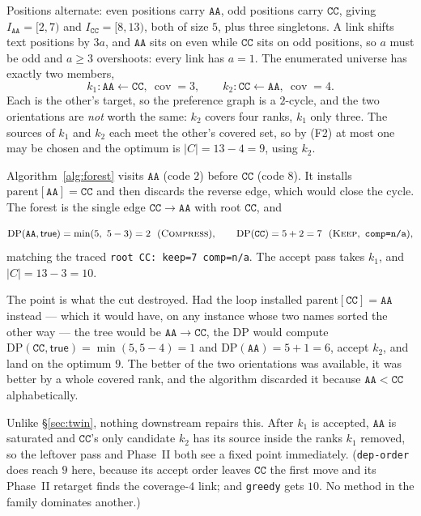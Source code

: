 \documentclass[11pt,a4paper]{article}
\theoremstyle{definition}
\theoremstyle{plain}
\theoremstyle{remark}
\newcommand{\cov}{\operatorname{cov}}
\newcommand{\KEEP}{\textnormal{\textsc{Keep}}}
\newcommand{\COMP}{\textnormal{\textsc{Compress}}}
\begin{document}
Positions alternate: even positions carry $\mathtt{AA}$, odd positions
carry $\mathtt{CC}$, giving $I_{\mathtt{AA}} = [2,7)$ and
$I_{\mathtt{CC}} = [8,13)$, both of size $5$, plus three singletons.
A link shifts text positions by $3a$, and $\mathtt{AA}$ sits on even
while $\mathtt{CC}$ sits on odd positions, so $a$ must be odd and
$a \ge 3$ overshoots: every link has $a = 1$. The enumerated universe
has exactly two members,
\[
  k_1 : \mathtt{AA} \leftarrow \mathtt{CC},\ \cov = 3,
  \qquad
  k_2 : \mathtt{CC} \leftarrow \mathtt{AA},\ \cov = 4 .
\]
Each is the other's target, so the preference graph is a $2$-cycle, and
the two orientations are \emph{not} worth the same: $k_2$ covers four
ranks, $k_1$ only three. The sources of $k_1$ and $k_2$ each meet the
other's covered set, so by (F2) at most one may be chosen and the
optimum is $|C| = 13 - 4 = 9$, using $k_2$.

Algorithm~\ref{alg:forest} visits $\mathtt{AA}$ (code $2$) before
$\mathtt{CC}$ (code $8$). It installs
$\mathrm{parent}[\mathtt{AA}] = \mathtt{CC}$ and then discards the
reverse edge, which would close the cycle. The forest is the single
edge $\mathtt{CC} \to \mathtt{AA}$ with root $\mathtt{CC}$, and

\[
  \mathrm{DP}(\mathtt{AA},\mathsf{true}) = \min(5,\ 5-3) = 2
  \ \ (\COMP),
  \qquad
  \mathrm{DP}(\mathtt{CC}) = 5 + 2 = 7
  \ \ (\KEEP,\ \texttt{comp=n/a}),
\]
matching the traced \texttt{root CC: keep=7 comp=n/a}. The accept pass
takes $k_1$, and $|C| = 13 - 3 = 10$.

The point is what the cut destroyed. Had the loop installed
$\mathrm{parent}[\mathtt{CC}] = \mathtt{AA}$ instead --- which it would
have, on any instance whose two names sorted the other way --- the tree
would be $\mathtt{AA} \to \mathtt{CC}$, the DP would compute
$\mathrm{DP}(\mathtt{CC},\mathsf{true}) = \min(5, 5-4) = 1$ and
$\mathrm{DP}(\mathtt{AA}) = 5 + 1 = 6$, accept $k_2$, and land on the
optimum $9$. The better of the two orientations was available, it was
better by a whole covered rank, and the algorithm discarded it because
$\mathtt{AA} < \mathtt{CC}$ alphabetically.

Unlike \S\ref{sec:twin}, nothing downstream repairs this. After $k_1$ is
accepted, $\mathtt{AA}$ is saturated and $\mathtt{CC}$'s only candidate
$k_2$ has its source inside the ranks $k_1$ removed, so the leftover
pass and Phase~II both see a fixed point immediately. (\texttt{dep-order}
does reach $9$ here, because its accept order leaves $\mathtt{CC}$ the
first move and its Phase~II retarget finds the coverage-$4$ link; and
\texttt{greedy} gets $10$. No method in the family dominates another.)
\end{document}
